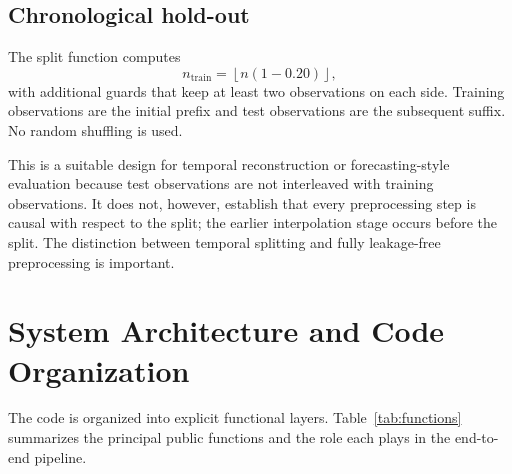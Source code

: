\documentclass[11pt,a4paper]{article}
\begin{document}
\subsection{Chronological hold-out}
The split function computes
\begin{equation}
 n_{\mathrm{train}} = \left\lfloor n(1-0.20)\right\rfloor,
\end{equation}
with additional guards that keep at least two observations on each side. Training observations are the initial prefix and test observations are the subsequent suffix. No random shuffling is used.

This is a suitable design for temporal reconstruction or forecasting-style evaluation because test observations are not interleaved with training observations. It does not, however, establish that every preprocessing step is causal with respect to the split; the earlier interpolation stage occurs before the split. The distinction between temporal splitting and fully leakage-free preprocessing is important.

\section{System Architecture and Code Organization}
The code is organized into explicit functional layers. Table~\ref{tab:functions} summarizes the principal public functions and the role each plays in the end-to-end pipeline.
\end{document}
